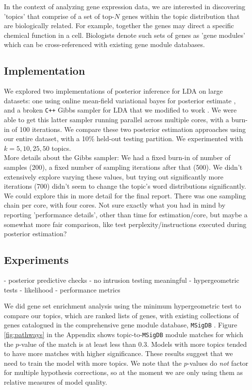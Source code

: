 \documentclass{article}
\begin{document}
In the context of analyzing gene expression data, we are interested in discovering 'topics' that comprise of a set of top-$N$ genes within the topic distribution that are biologically related. For example, together the genes may direct a specific chemical function in a cell. Biologists denote such sets of genes as 'gene modules' which can be cross-referenced with existing gene module databases.

\subsection{Implementation} 
We explored two implementations of posterior inference for LDA on large datasets: one using online mean-field variational bayes for posterior estimate \cite{ovb, online}, and a broken \texttt{C++} Gibbs sampler for LDA that we modified to work \cite{plda}. We were able to get this latter sampler running parallel across multiple cores, with a burn-in of 100 iterations. We compare these two posterior estimation approaches using our entire dataset, with a 10\% held-out testing partition. We experimented with
$k=5, 10, 25, 50$ topics. \\

More details about the Gibbs sampler: We had a fixed burn-in of number of samples (200), a fixed number of sampling iterations after that (500). We didn't extensively explore varying these values, but trying out significantly more iterations (700) didn't seem to change the topic's word distributions significantly. We could explore this in more detail for the final report. There was one sampling chain per core, with four cores. Not sure exactly what you had in mind by reporting
'performance details', other than time for estimation/core, but maybe a somewhat more fair comparison, like test perplexity/instructions executed during posterior estimation?

\subsection{Experiments} 
- posterior predictive checks
- no intrusion testing meaningful
- hypergeometric tests
- likelihood
- performance metrics

We did gene set enrichment analysis using the minimum hypergeometric test \cite{hg} to compare our topics, which are ranked lists of genes, with existing collections of genes catalogued in the comprehensive gene module database, \texttt{MSigDB} \cite{msigdb}. Figure \ref{fig:pathways} in the Appendix shows topic-to-\texttt{MSigDB} module matches for which the $p$-value of the match is at least less than 0.3. Models with more topics tended to have more matches with higher significance. These results suggest that we need to train the model with more topics. We note that the $p$-values do \textit{not} factor for multiple hypothesis corrections, so at the moment we are only using them as relative measures of model quality.
\end{document}
